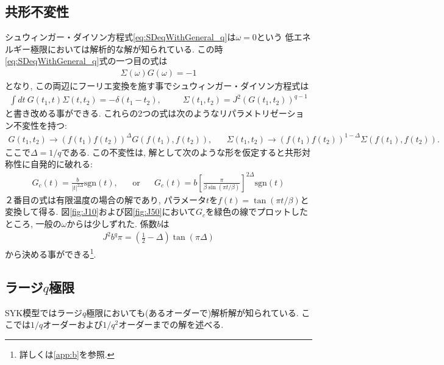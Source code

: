 \subsection{共形不変性}
シュウィンガー・ダイソン方程式\eqref{eq:SDeqWithGeneral_q}は$\omega = 0$という
低エネルギー極限においては解析的な解が知られている. 
この時\eqref{eq:SDeqWithGeneral_q}式の一つ目の式は
\begin{align}
	\Sigma(\omega)G(\omega) = -1
\end{align}
となり, この両辺にフーリエ変換を施す事でシュウィンガー・ダイソン方程式は
\begin{align}
	\int dt\ G(t_1, t)\Sigma(t, t_2) = -\delta(t_1 - t_2),
	\hspace{30pt}
	\Sigma(t_1, t_2) = J^2 (G(t_1, t_2))^{q-1}
	\label{eq:conformalSD}
\end{align}
と書き改める事ができる.
これらの2つの式は次のようなリパラメトリゼーション不変性を持つ:
\begin{align}
	G(t_1, t_2) \to (f(t_1)f(t_2))^{\Delta}G(f(t_1),f(t_2)),
	\hspace{20pt}
	\Sigma(t_1, t_2) \to (f(t_1)f(t_2))^{1 - \Delta}\Sigma(f(t_1),f(t_2)).
	\label{eq:reparametrization_of_G_and_Sigma}
\end{align}
ここで$\Delta = 1 / q$である. 
この不変性は, 解として次のような形を仮定すると共形対称性に自発的に破れる:
\begin{align}
	G_c(t) = \frac{b}{|t|^{2\Delta}}\mathrm{sgn}(t),
	\hspace{20pt}
	\mathrm{or}
	\hspace{20pt}
	G_c(t) = b\left[\frac{\pi}{\beta\sin(\pi t / \beta)}\right]^{2\Delta}\mathrm{sgn}(t)
	\label{eq:conformal_ansatz}
\end{align}
２番目の式は有限温度の場合の解であり, パラメータ$t$を$f(t) = \tan(\pi t / \beta)$と変換して得る. 
図\ref{fig:J10}および図\ref{fig:J50}において$G_c$を緑色の線でプロットしたところ, 一般の$\omega$からは少しずれた. 
係数$b$は
\begin{align}
	J^2 b^q \pi = \left(\frac{1}{2} - \Delta \right)\tan(\pi \Delta)
\end{align}
から決める事ができる\footnote{詳しくは\ref{app:b}を参照.}. 

\subsection{ラージ$q$極限}
SYK模型ではラージ$q$極限においても(あるオーダーで)解析解が知られている. 
ここでは$1/q$オーダーおよび$1/q^2$オーダーまでの解を述べる. 

